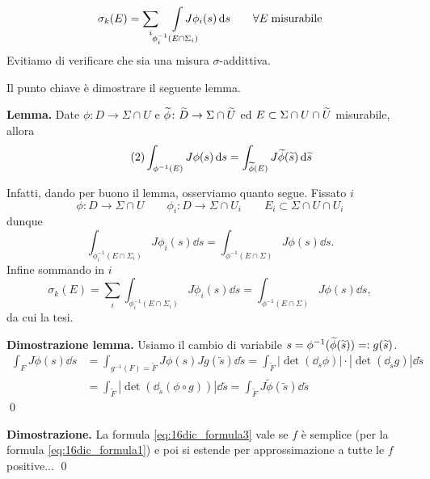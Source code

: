 
%
$$
	\sigma_k (E) = \sum_i \quad  \int\limits_{\mathclap{\phi_i^{-1}(E \cap \Sigma_i)}} J \phi_i(s) \dd s \qquad \forall E \; \text{misurabile}
$$
%
Evitiamo di verificare che sia una misura $\sigma$-addittiva.

\newpage

Il punto chiave è dimostrare il seguente lemma.

\textbf{Lemma.} Date $\phi \colon D \to \Sigma \cap U$ e $\widetilde{\phi} \colon \widetilde{D} \to \Sigma \cap \widetilde{U}$ ed $E \subset \Sigma \cap U \cap \widetilde{U}$ misurabile, allora
%
\begin{equation}
	\label{eq:16dic_formula2} \tag{2}
	\int_{\phi^{-1}(E)} J\phi(s) \,\mathrm{d} s = \int_{\widetilde{\phi}(E)} J\widetilde{\phi}(\widetilde{s}) \,\mathrm{d} \widetilde{s}
\end{equation}
%

Infatti, dando per buono il lemma, osserviamo quanto segue.
Fissato $i$
$$
	\phi \colon D \to \Sigma \cap U \qquad \phi_i \colon D \to \Sigma \cap U_i
	\qquad E_i \subset \Sigma \cap U \cap U_i
$$
dunque
$$
	\int_{\phi_i^{-1}(E \cap \Sigma_i)} J \phi_i(s) \dd s
	= \int_{\phi^{-1}(E \cap \Sigma)} J \phi(s) \dd s.
$$
Infine sommando in $i$
$$
	\sigma_k(E)
	= \sum_i \int_{\phi_i^{-1}(E \cap \Sigma_i)} J \phi_i(s) \dd s 
	= \int_{\phi^{-1}(E \cap \Sigma)} J \phi(s) \dd s,
$$
da cui la tesi.

\textbf{Dimostrazione lemma.} Usiamo il cambio di variabile $s = \phi^{-1}(\widetilde{\phi}(\widetilde{s})) =: g(\widetilde{s})$.
\begin{align*}
	\int_F J\phi(s) \dd s & = \int_{g^{-1}(F) = \tilde{F}} J\phi(s) Jg(\tilde{s}) \dd \tilde{s}
	= \int_{\tilde{F}} |\det(\dd_s \phi)| \cdot | \det(\dd_{\tilde{s}}g)| \dd \tilde{s} \\
	& = \int_{\tilde{F}} \left| \det (\dd_{\tilde{s}}(\phi \circ g)) \right| \dd \tilde{s}
	= \int_{\tilde{F}} J \tilde{\phi}(\tilde{s}) \dd \tilde{s}
\end{align*}
%
\qed

\textbf{Dimostrazione.} La formula \eqref{eq:16dic_formula3} vale se $f$ è semplice (per la formula \eqref{eq:16dic_formula1}) e poi si estende per approssimazione a tutte le $f$ positive...
\qed

